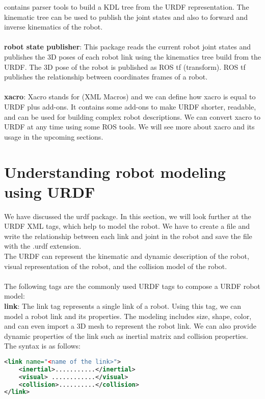 contains parser tools to build a KDL tree from the URDF representation. The kinematic 
tree can be used to publish the joint states and also to forward and inverse 
kinematics of the robot.
\\\\\textbf{robot state publisher}: This package reads the current robot joint states 
and publishes 
the 3D poses of each robot link using the kinematics tree build from the URDF. The 3D 
pose of the robot is published as ROS tf (transform). ROS tf publishes the 
relationship 
between coordinates frames of a robot.
\\\\\textbf{xacro}: Xacro stands for (XML Macros) and we can define how xacro is equal 
to URDF plus add-ons. It contains some add-ons to make URDF shorter, readable, and can 
be used for building complex robot descriptions. We can convert xacro to URDF at any 
time using some ROS tools. We will see more about xacro and its usage in the upcoming 
sections.

\section{Understanding robot modeling using URDF}

We have discussed the urdf package. In this section, we will look further at the URDF XML tags, which help to model the robot. We have to create a file and write the relationship between each link and joint in the robot and save the file with the .urdf extension.
\\The URDF can represent the kinematic and dynamic description of the robot, visual representation of the robot, and the collision model of the robot.
\\\\The following tags are the commonly used URDF tags to compose a URDF robot model:
\\ \textbf{link}: The link tag represents a single link of a robot. Using this tag, we can model a robot link and its properties. The modeling includes size, shape, color, and can even import a 3D mesh to represent the robot link. We can also provide dynamic properties of the link such as inertial matrix and collision properties.
\\
The syntax is as follows:
\begin{lstlisting}[language=XML]
<link name="<name of the link>">
    <inertial>...........</inertial>
    <visual> ............</visual>
    <collision>..........</collision>
</link>
\end{lstlisting}

